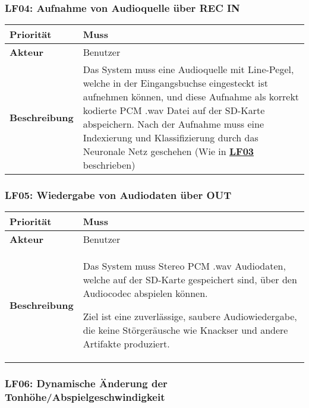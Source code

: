
\subsubsection{LF04: Aufnahme von Audioquelle über REC IN}
\hypertarget{lf-audiorecord}{}

\begin{table}[h!]
	\begin{tabularx}{\textwidth}{|l|X|}
		\hline
		\textbf{Priorität} & Muss \\ \hline
		\textbf{Akteur} & Benutzer \\ \hline
		\textbf{Beschreibung} & Das System muss eine Audioquelle mit Line-Pegel, welche in der Eingangsbuchse eingesteckt ist aufnehmen können, und diese Aufnahme als korrekt kodierte PCM .wav Datei auf der SD-Karte abspeichern. Nach der Aufnahme muss eine Indexierung und Klassifizierung durch das Neuronale Netz geschehen (Wie in \textbf{\hyperlink{lf-nn-01}{LF03}} beschrieben)
		\\ \hline
	\end{tabularx}
\end{table}




\subsubsection{LF05: Wiedergabe von Audiodaten über OUT}
\hypertarget{lf-audioplayback}{}

\begin{table}[h!]
	\begin{tabularx}{\textwidth}{|l|X|}
		\hline
		\textbf{Priorität} & Muss \\ \hline
		\textbf{Akteur} & Benutzer \\ \hline
		\textbf{Beschreibung} & Das System muss Stereo PCM .wav Audiodaten, welche auf der SD-Karte gespeichert sind, über den Audiocodec abspielen können.
		
		Ziel ist eine zuverlässige, saubere Audiowiedergabe, die keine Störgeräusche wie Knackser und andere Artifakte produziert.
		\\ \hline
	\end{tabularx}
\end{table}



\subsubsection{LF06: Dynamische Änderung der Tonhöhe/Abspielgeschwindigkeit}
\hypertarget{lf-pitchaudio}{}

